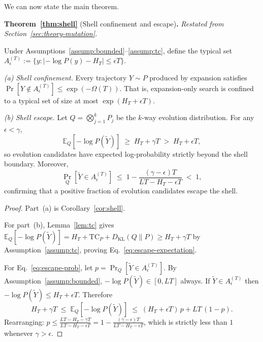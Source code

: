 \documentclass{llmxive}
\begin{document}
We can now state the main theorem.


\noindent\textbf{Theorem~\ref{thm:shell}} (Shell confinement and escape)\textbf{.}
\textit{Restated from Section~\ref{sec:theory-mutation}.}
\medskip

\noindent Under Assumptions~\ref{assump:bounded}--\ref{assump:tc}, define the typical set $A_\epsilon^{(T)}:=\{y:|-\log P(y)-H_T|\le\epsilon T\}$.

\textit{(a) Shell confinement.} Every trajectory $Y \sim P$ produced by expansion satisfies $\Pr[Y \notin A_\epsilon^{(T)}] \leq \exp(-\Omega(T))$. That is, expansion-only search is confined to a typical set of size at most $\exp(H_T + \epsilon T)$.

\textit{(b) Shell escape.} Let $Q = \bigotimes_{j=1}^k P_j$ be the $k$-way evolution distribution. For any $\epsilon < \gamma$,
\begin{equation*}
  \mathbb{E}_Q[-\log P(\widetilde{Y})] \;\geq\; H_T + \gamma T \;>\; H_T + \epsilon T,
\end{equation*}
so evolution candidates have expected log-probability strictly beyond the shell boundary. Moreover,
\begin{equation*}
  \Pr_Q\!\left[\widetilde{Y} \in A_\epsilon^{(T)}\right] \;\leq\; 1 - \frac{(\gamma - \epsilon)T}{LT - H_T - \epsilon T} \;<\; 1,
\end{equation*}
confirming that a positive fraction of evolution candidates escape the shell.


\begin{proof}
Part~(a) is Corollary~\ref{cor:shell}.

For part~(b), Lemma~\ref{lem:tc} gives $\mathbb{E}_Q[-\log P(\widetilde{Y})] = H_T + \mathrm{TC}_P + D_{\mathrm{KL}}(Q \| P) \geq H_T + \gamma T$ by Assumption~\ref{assump:tc}, proving Eq.~\eqref{eq:escape-expectation}.

For Eq.~\eqref{eq:escape-prob}, let $p = \Pr_Q[\widetilde{Y} \in A_\epsilon^{(T)}]$. By Assumption~\ref{assump:bounded}, $-\log P(\widetilde{Y}) \in [0, LT]$ always. If $\widetilde{Y} \in A_\epsilon^{(T)}$ then $-\log P(\widetilde{Y}) \leq H_T + \epsilon T$. Therefore
\begin{equation}
  H_T + \gamma T \;\leq\; \mathbb{E}_Q[-\log P(\widetilde{Y})] \;\leq\; (H_T + \epsilon T)\,p + LT\,(1 - p).
\end{equation}
Rearranging: $p \leq \frac{LT - H_T - \gamma T}{LT - H_T - \epsilon T} = 1 - \frac{(\gamma - \epsilon)T}{LT - H_T - \epsilon T}$, which is strictly less than $1$ whenever $\gamma > \epsilon$.
\end{proof}
\end{document}
